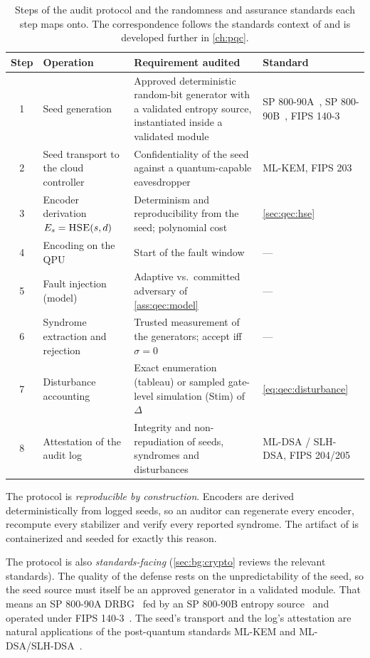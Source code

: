 \begin{table}[htbp]
\caption{Steps of the audit protocol and the randomness and assurance standards each step maps onto. The correspondence follows the standards context of \cite{guo2026qecaudit} and is developed further in \cref{ch:pqc}.}
\label{tab:qec:protocol}
\centering\footnotesize
\begin{tabularx}{\textwidth}{@{}c p{2.9cm} X p{3.9cm}@{}}
\toprule
Step & Operation & Requirement audited & Standard \\
\midrule
1 & Seed generation & Approved deterministic random-bit generator with a validated entropy source, instantiated inside a validated module & SP 800-90A~\cite{nist2015sp80090a}, SP 800-90B~\cite{nist2018sp80090b}, FIPS 140-3~\cite{nist2019fips1403} \\
2 & Seed transport to the cloud controller & Confidentiality of the seed against a quantum-capable eavesdropper & ML-KEM, FIPS 203~\cite{nist2024fips203} \\
3 & Encoder derivation $E_s=\textsc{HSE}(s,d)$ & Determinism and reproducibility from the seed; polynomial cost & \cref{sec:qec:hse} \\
4 & Encoding on the QPU & Start of the fault window & --- \\
5 & Fault injection (model) & Adaptive vs.\ committed adversary of \cref{ass:qec:model} & --- \\
6 & Syndrome extraction and rejection & Trusted measurement of the generators; accept iff $\sigma=0$ & --- \\
7 & Disturbance accounting & Exact enumeration (tableau) or sampled gate-level simulation (Stim) of $\Delta$ & \cref{eq:qec:disturbance} \\
8 & Attestation of the audit log & Integrity and non-repudiation of seeds, syndromes and disturbances & ML-DSA / SLH-DSA, FIPS 204/205~\cite{nist2024fips204,nist2024fips205} \\
\bottomrule
\end{tabularx}
\end{table}

The protocol is \emph{reproducible by construction}. Encoders are derived deterministically from logged seeds, so an auditor can regenerate every encoder, recompute every stabilizer and verify every reported syndrome. The artifact of \cite{guo2026qecaudit} is containerized and seeded for exactly this reason.

The protocol is also \emph{standards-facing} (\cref{sec:bg:crypto} reviews the relevant standards). The quality of the defense rests on the unpredictability of the seed, so the seed source must itself be an approved generator in a validated module. That means an SP 800-90A DRBG~\cite{nist2015sp80090a} fed by an SP 800-90B entropy source~\cite{nist2018sp80090b} and operated under FIPS 140-3~\cite{nist2019fips1403}. The seed's transport and the log's attestation are natural applications of the post-quantum standards ML-KEM and ML-DSA/SLH-DSA~\cite{nist2024fips203,nist2024fips204,nist2024fips205}.

